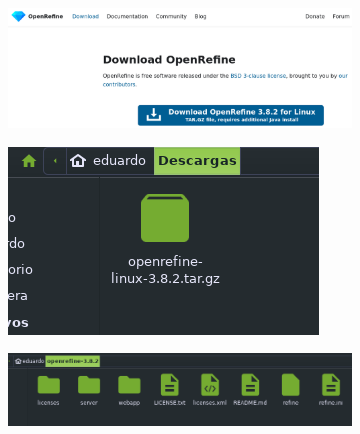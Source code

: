 \documentclass[12pt]{article}
\begin{document}
\begin{itemize}
\begin{figure}[!h]
\begin{subfigure}[b]{0.7\textwidth}
                                \includegraphics[width=\textwidth]{img/openrefine-2.png}
                            \end{subfigure}
                            \hfill
                            \begin{subfigure}[b]{0.4\textwidth}
                               
                                \includegraphics[width=\textwidth]{img/openrefine-3.png}
                            \end{subfigure}
                            \hfill
                            \begin{subfigure}[b]{0.7\textwidth}
                                
                                \includegraphics[width=\textwidth]{img/openrefine-4.png}
                            \end{subfigure}
                            \hfill
                            \begin{subfigure}[b]{0.7\textwidth}
                                

\end{subfigure}
\end{figure}
\end{itemize}
\end{document}
